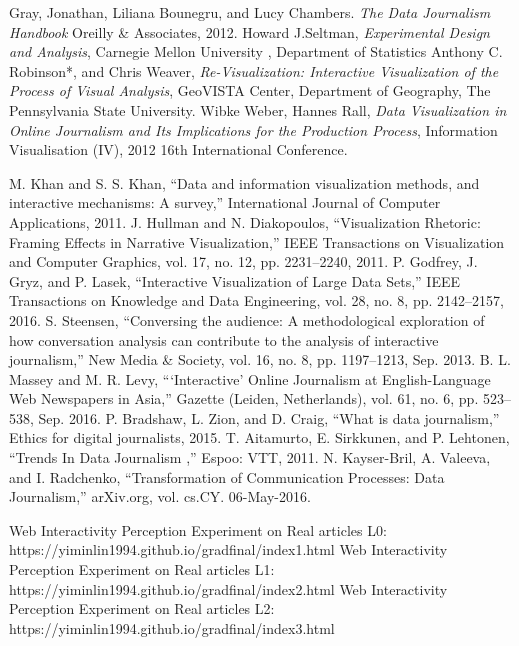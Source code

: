 \documentclass[9pt,journal,compsoc]{IEEEtran}
\begin{document}
\begin{thebibliography}{99}
{} Gray, Jonathan, Liliana Bounegru, and Lucy Chambers. \textit{The Data Journalism Handbook} Oreilly \& Associates, 2012.
 Howard J.Seltman, \textit{Experimental Design and Analysis}, Carnegie Mellon University , Department of Statistics
 Anthony C. Robinson*, and Chris Weaver, \textit{Re-Visualization: Interactive Visualization of the Process of Visual Analysis}, GeoVISTA Center, Department of Geography, The Pennsylvania State University. 
 Wibke Weber, Hannes Rall, \textit{Data Visualization in Online Journalism and Its Implications for the Production Process}, Information Visualisation (IV), 2012 16th International Conference.

 M. Khan and S. S. Khan, “Data and information visualization methods, and interactive mechanisms: A survey,” International Journal of Computer Applications, 2011.
 J. Hullman and N. Diakopoulos, “Visualization Rhetoric: Framing Effects in Narrative Visualization,” IEEE Transactions on Visualization and Computer Graphics, vol. 17, no. 12, pp. 2231–2240, 2011.
 P. Godfrey, J. Gryz, and P. Lasek, “Interactive Visualization of Large Data Sets,” IEEE Transactions on Knowledge and Data Engineering, vol. 28, no. 8, pp. 2142–2157, 2016.
 S. Steensen, “Conversing the audience: A methodological exploration of how conversation analysis can contribute to the analysis of interactive journalism,” New Media \& Society, vol. 16, no. 8, pp. 1197–1213, Sep. 2013.
 B. L. Massey and M. R. Levy, “`Interactive' Online Journalism at English-Language Web Newspapers in Asia,” Gazette (Leiden, Netherlands), vol. 61, no. 6, pp. 523–538, Sep. 2016.
 P. Bradshaw, L. Zion, and D. Craig, “What is data journalism,” Ethics for digital journalists, 2015.
 T. Aitamurto, E. Sirkkunen, and P. Lehtonen, “Trends In Data Journalism ,” Espoo: VTT, 2011.
 N. Kayser-Bril, A. Valeeva, and I. Radchenko, “Transformation of Communication Processes: Data Journalism,” arXiv.org, vol. cs.CY. 06-May-2016. 

 Web Interactivity Perception Experiment on Real articles L0: https://yiminlin1994.github.io/gradfinal/index1.html
 Web Interactivity Perception Experiment on Real articles L1: https://yiminlin1994.github.io/gradfinal/index2.html
 Web Interactivity Perception Experiment on Real articles L2: https://yiminlin1994.github.io/gradfinal/index3.html 


\end{thebibliography}
\end{document}
